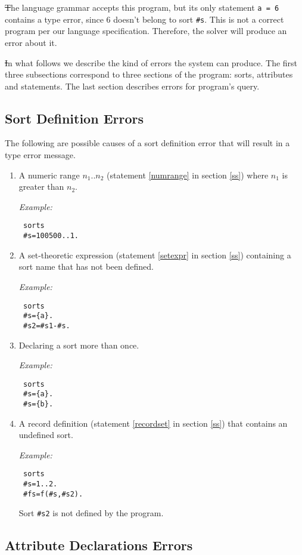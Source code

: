 \documentclass[12pt, letterpaper]{article}
\begin{document}
 \st
 The language grammar accepts this program, but its only statement \texttt{a = 6} contains a type error, since $6$ doesn't belong to sort \texttt{\#s}. This is not a correct program per our language specification. Therefore, the solver will produce an error about it.

 \st
 In what follows we describe the kind of errors the system can produce. The first three subsections correspond to three sections of the program: sorts, attributes and statements. The last section describes errors for program's query.
 \medskip\noindent
 
\subsection{Sort Definition Errors}
The following are possible causes of a sort definition error  that will result in a type error  message.
\begin{enumerate}
\item A numeric range $n_1..n_2$ (statement \ref{numrange} in section \ref{ss}) where  $n_1$ is greater than $n_2$.

\textit{Example:}
\begin{verbatim}
 sorts
 #s=100500..1.
\end{verbatim}


\item  A set-theoretic expression (statement \ref{setexpr} in section \ref{ss}) containing a sort name that has not been defined.

\textit{Example:}
\begin{verbatim}
 sorts
 #s={a}.
 #s2=#s1-#s.
\end{verbatim}

\item  Declaring a sort more than once.

\textit{Example:}
\begin{verbatim}
 sorts
 #s={a}.
 #s={b}.
\end{verbatim}

\item A record definition (statement \ref{recordset} in section \ref{ss}) that contains an undefined sort.

\textit{Example:}
\begin{verbatim}
 sorts
 #s=1..2.
 #fs=f(#s,#s2).
\end{verbatim}
Sort \texttt{\#s2} is not defined by the program.
\end{enumerate}
\subsection{Attribute Declarations Errors}
\end{document}
